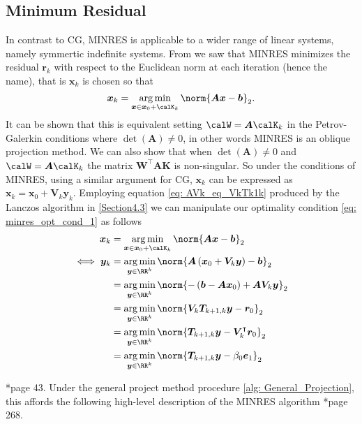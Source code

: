 \subsection{Minimum Residual}\label{Section4.6}
In contrast to CG, MINRES is applicable to a wider range of linear systems, namely symmertic indefinite systems. From  we saw that MINRES minimizes the residual $\bm{r}_k$ with respect to the Euclidean norm at each iteration (hence the name), that is $\bm{x}_k$ is chosen so that
\begin{equation} \label{eq: minres_opt_cond_1}
    \bm{x}_k = \argmin_{\bm{x} \in \bm{x}_0 + \calK_k} \norm{\bm{A} \bm {x} - \bm{b}}_2.
\end{equation}
It can be shown that this is equivalent setting $\calW = \bm{A} \calK_k$ in the Petrov-Galerkin conditions where $\det \left( \bm{A} \right) \neq 0$, in other words MINRES is an oblique projection method. We can also show that when $\det \left( \bm{A} \right) \neq 0$ and $\calW = \bm{A} \calK_k$ the matrix $\bm{W}^{\intercal} \bm{A} \bm{K}$ is non-singular. So under the conditions of MINRES, using a similar argument for CG, $\bm{x}_k$ can be expressed as $\bm{x}_k = \bm{x}_0 + \bm{V}_k \bm{y}_k$. Employing equation \ref{eq: AVk_eq_VkTk1k} produced by the Lanczos algorithm in \ref{Section4.3} we can manipulate our optimality condition \ref{eq: minres_opt_cond_1} as follows
\begin{align*}
    \bm{x}_k      & = \argmin_{\bm{x} \in \bm{x}_0 + \calK_k} \norm{\bm{A} \bm {x} - \bm{b}}_2                                 \\
    \iff \bm{y}_k & = \argmin_{\bm{y} \in \RR^k} \norm{\bm{A} \left( \bm{x}_0 + \bm{V}_k \bm{y} \right) - \bm{b}}_2            \\
                  & = \argmin_{\bm{y} \in \RR^k} \norm{ - \left( \bm{b} - \bm{A} \bm{x}_0 \right) + \bm{A} \bm{V}_k \bm{y} }_2 \\
                  & = \argmin_{\bm{y} \in \RR^k} \norm{ \bm{V}_{k} \bm{T}_{k+1,k} \bm{y} - \bm{r}_0 }_2                        \\
                  & = \argmin_{\bm{y} \in \RR^k} \norm{ \bm{T}_{k+1,k} \bm{y} - \bm{V}_{k}^{\intercal} \bm{r}_0 }_2            \\
                  & = \argmin_{\bm{y} \in \RR^k} \norm{ \bm{T}_{k+1,k} \bm{y} - \beta_0 \bm{e}_1 }_2
\end{align*}

\cite{GreenbaumAnne1997Imfs}*{page 43}. Under the general project method procedure \ref{alg: General_Projection}, this affords the following high-level description of the MINRES algorithm \cite{TrefethenLloydN.LloydNicholas1997Nla/}*{page 268}.


